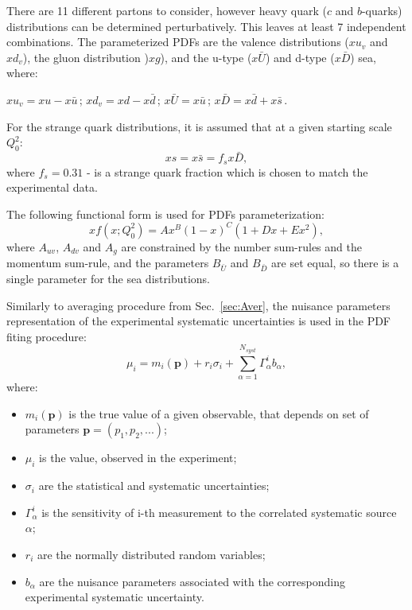 There are 11 different partons to consider, however heavy quark ($c$ and $b$-quarks) distributions can be determined perturbatively. This leaves at least 7 independent combinations. The parameterized PDFs are the valence distributions ($xu_{v}$ and $xd_{v}$), the gluon distribution )$xg$), and the u-type ($x\bar{U}$) and d-type ($x\bar{D}$) sea, where:
\begin{center}
$xu_{v} = xu - x\bar{u}\, $;  $xd_{v} = xd-x\bar{d}\, $;   $x\bar{U}=x\bar{u}\, $;  $x\bar{D}=x\bar{d}+x\bar{s}\, $. 
\end{center}
For the strange quark distributions, it is assumed that at a given starting scale $Q^2_0$:
\begin{equation}
xs = x\bar{s} = f_sx\bar{D},
\end{equation} 
where $f_s = 0.31$ - is a strange quark fraction which is chosen to match the experimental data. 

The following functional form is used for PDFs parameterization:
\begin{equation}
xf(x; Q^2_0) = A x^{B} (1-x)^{C} (1+Dx+Ex^2),
\end{equation}
where $A_{uv}$, $A_{dv}$ and $A_g$ are constrained by the number sum-rules and the momentum sum-rule, and the parameters $B_{\bar{U}}$ and $B_{\bar{D}}$ are set equal, so there is a single parameter for the sea distributions\cite{xfittManual}.

Similarly to averaging procedure from Sec.~\ref{sec:Aver}, the nuisance parameters representation of the experimental systematic uncertainties is used in the PDF fiting procedure:
\begin{equation}
\mu_i = m_i(\mathbf{p})+r_i\sigma_i + \sum_{\alpha=1}^{N_{syst}} \Gamma_{\alpha}^{i}b_{\alpha}, 
\end{equation}
where:
\begin{itemize}
\item $m_i(\mathbf{p})$ is the true value of a given observable, that depends on set of parameters $\mathbf{p} = (p_1, p_2,...)$;
\item $\mu_i$ is the value, observed in the experiment;
\item $\sigma_i$ are the statistical and systematic uncertainties;
\item $\Gamma_{\alpha}^{i}$ is the sensitivity of i-th measurement to the correlated systematic source $\alpha$;
\item $r_i$ are the normally distributed random variables;
\item $b_{\alpha}$ are the nuisance parameters associated with the corresponding experimental systematic uncertainty.
\end{itemize}

